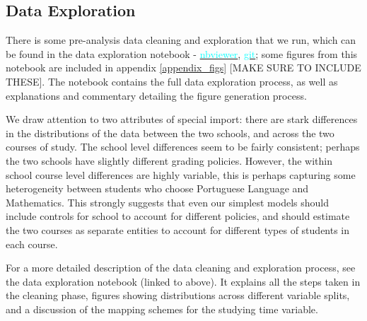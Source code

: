 \documentclass[12pt]{article}
\begin{document}
\subsection{Data Exploration}
There is some pre-analysis data cleaning and exploration that we run, which can be found in the data exploration notebook - \href{https://nbviewer.jupyter.org/github/nadavtadelis/Reproducible_Metrics/blob/master/data_exploration.ipynb}{\textcolor{cyan}{nbviewer}}, \href{https://github.com/nadavtadelis/Reproducible_Metrics/blob/master/data_exploration.ipynb}{\textcolor{cyan}{git}}; some figures from this notebook are included in appendix \ref{appendix_figs} \textcolor{BrickRed}{[MAKE SURE TO INCLUDE THESE]}. The notebook contains the full data exploration process, as well as explanations and commentary detailing the figure generation process.

We draw attention to two attributes of special import: there are stark differences in the distributions of the data between the two schools, and across the two courses of study. The school level differences seem to be fairly consistent; perhaps the two schools have slightly different grading policies. However, the within school course level differences are highly variable, this is perhaps capturing some heterogeneity between students who choose Portuguese Language and Mathematics. This strongly suggests that even our simplest models should include controls for school to account for different policies, and should estimate the two courses as separate entities to account for different types of students in each course.

For a more detailed description of the data cleaning and exploration process, see the data exploration notebook (linked to above). It explains all the steps taken in the cleaning phase, figures showing distributions across different variable splits, and a discussion of the mapping schemes for the studying time variable.


\end{document}
